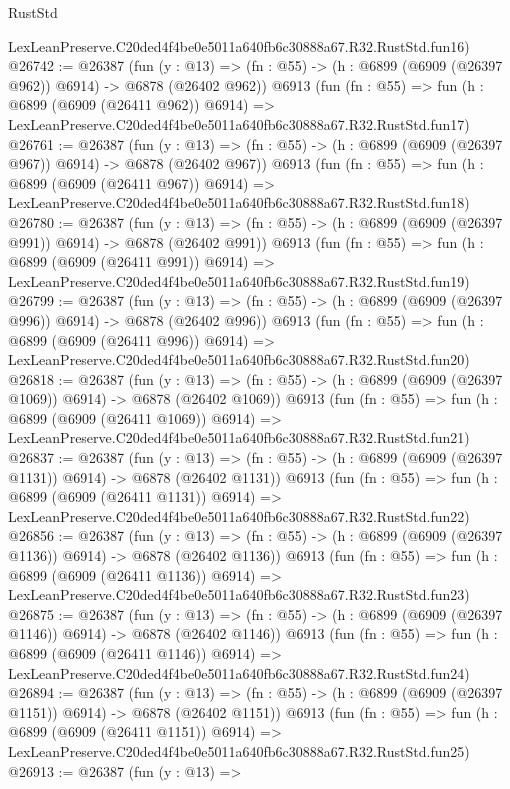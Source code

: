\begin{lexlean}{RustStd}
\begin{coremodule}
    LexLeanPreserve.C20ded4f4be0e5011a640fb6c30888a67.R32.RustStd.fun16)
@26742 := @26387
    (fun (y : @13) => (fn : @55) -> (h : @6899 (@6909 (@26397 @962)) @6914) -> @6878 (@26402 @962))
    @6913
    (fun (fn : @55) =>
    fun (h : @6899 (@6909 (@26411 @962)) @6914) =>
    LexLeanPreserve.C20ded4f4be0e5011a640fb6c30888a67.R32.RustStd.fun17)
@26761 := @26387
    (fun (y : @13) => (fn : @55) -> (h : @6899 (@6909 (@26397 @967)) @6914) -> @6878 (@26402 @967))
    @6913
    (fun (fn : @55) =>
    fun (h : @6899 (@6909 (@26411 @967)) @6914) =>
    LexLeanPreserve.C20ded4f4be0e5011a640fb6c30888a67.R32.RustStd.fun18)
@26780 := @26387
    (fun (y : @13) => (fn : @55) -> (h : @6899 (@6909 (@26397 @991)) @6914) -> @6878 (@26402 @991))
    @6913
    (fun (fn : @55) =>
    fun (h : @6899 (@6909 (@26411 @991)) @6914) =>
    LexLeanPreserve.C20ded4f4be0e5011a640fb6c30888a67.R32.RustStd.fun19)
@26799 := @26387
    (fun (y : @13) => (fn : @55) -> (h : @6899 (@6909 (@26397 @996)) @6914) -> @6878 (@26402 @996))
    @6913
    (fun (fn : @55) =>
    fun (h : @6899 (@6909 (@26411 @996)) @6914) =>
    LexLeanPreserve.C20ded4f4be0e5011a640fb6c30888a67.R32.RustStd.fun20)
@26818 := @26387
    (fun (y : @13) =>
    (fn : @55) -> (h : @6899 (@6909 (@26397 @1069)) @6914) -> @6878 (@26402 @1069))
    @6913
    (fun (fn : @55) =>
    fun (h : @6899 (@6909 (@26411 @1069)) @6914) =>
    LexLeanPreserve.C20ded4f4be0e5011a640fb6c30888a67.R32.RustStd.fun21)
@26837 := @26387
    (fun (y : @13) =>
    (fn : @55) -> (h : @6899 (@6909 (@26397 @1131)) @6914) -> @6878 (@26402 @1131))
    @6913
    (fun (fn : @55) =>
    fun (h : @6899 (@6909 (@26411 @1131)) @6914) =>
    LexLeanPreserve.C20ded4f4be0e5011a640fb6c30888a67.R32.RustStd.fun22)
@26856 := @26387
    (fun (y : @13) =>
    (fn : @55) -> (h : @6899 (@6909 (@26397 @1136)) @6914) -> @6878 (@26402 @1136))
    @6913
    (fun (fn : @55) =>
    fun (h : @6899 (@6909 (@26411 @1136)) @6914) =>
    LexLeanPreserve.C20ded4f4be0e5011a640fb6c30888a67.R32.RustStd.fun23)
@26875 := @26387
    (fun (y : @13) =>
    (fn : @55) -> (h : @6899 (@6909 (@26397 @1146)) @6914) -> @6878 (@26402 @1146))
    @6913
    (fun (fn : @55) =>
    fun (h : @6899 (@6909 (@26411 @1146)) @6914) =>
    LexLeanPreserve.C20ded4f4be0e5011a640fb6c30888a67.R32.RustStd.fun24)
@26894 := @26387
    (fun (y : @13) =>
    (fn : @55) -> (h : @6899 (@6909 (@26397 @1151)) @6914) -> @6878 (@26402 @1151))
    @6913
    (fun (fn : @55) =>
    fun (h : @6899 (@6909 (@26411 @1151)) @6914) =>
    LexLeanPreserve.C20ded4f4be0e5011a640fb6c30888a67.R32.RustStd.fun25)
@26913 := @26387
    (fun (y : @13) =>

\end{coremodule}
\end{lexlean}
